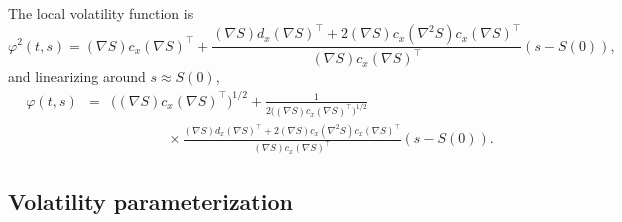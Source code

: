 \documentclass[12pt]{article}
\begin{document}
    The local volatility function is
    \begin{equation}
      \varphi^2(t,s)=(\nabla S) c_x (\nabla S)^{\top}
          + \frac{(\nabla S) d_x (\nabla S)^{\top} + 2(\nabla S) c_x (\nabla^2 S) c_x (\nabla S)^{\top}}
                 {(\nabla S) c_x (\nabla S)^{\top}}\left(s-S(0)\right),
    \end{equation}
    and linearizing around $s\approx S(0)$,
    \begin{eqnarray}
      \varphi(t,s)&=&\bigg((\nabla S) c_x (\nabla S)^{\top}\bigg)^{1/2}
                      + \frac{1}{2\bigg((\nabla S) c_x (\nabla S)^{\top}\bigg)^{1/2}}\nonumber\\
          &&\quad\quad\quad\quad \times\frac{(\nabla S) d_x (\nabla S)^{\top} + 2(\nabla S) c_x (\nabla^2 S) c_x (\nabla S)^{\top}}
                                            {(\nabla S) c_x (\nabla S)^{\top}}\left(s-S(0)\right).
    \end{eqnarray}

  \subsection{Volatility parameterization}
\end{document}
